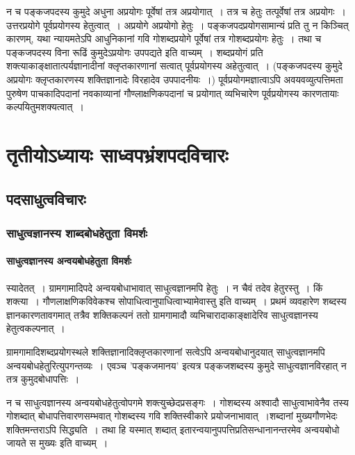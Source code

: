 				न च पङ्कजपदस्य कुमुदे अधुना अप्रयोगः पूर्वेषां तत्र अप्रयोगात्~। तत्र च हेतुः तत्पूर्वेषां तत्र अप्रयोगः~। उत्तरप्रयोगे  पूर्वप्रयोगस्य हेतुत्वात्~। अप्रयोगे अप्रयोगो हेतुः~। पङ्कजपदप्रयोगसामान्यं प्रति तु न किञ्चित् कारणम्, यथा न्यायमतेऽपि  आधुनिकानां गवि गोशब्दप्रयोगे पूर्वेषां तत्र गोशब्दप्रयोगः हेतुः~। तथा च पङ्कजपदस्य विना रूढिं  कुमुदेऽप्रयोगः उपपद्यते इति वाच्यम्~। शब्दप्रयोगं प्रति शक्त्याकाङ्क्षातात्पर्यज्ञानादीनां क्लृप्तकारणानां सत्वात् पूर्वप्रयोगस्य अहेतुत्वात्~। (पङ्कजपदस्य कुमुदे अप्रयोगः क्लृप्तकारणस्य शक्तिज्ञानादेः विरहादेव उपपादनीयः~।) पूर्वप्रयोगमज्ञात्वाऽपि अवयवव्युत्पत्तिमता पुरुषेण पाचकादिपदानां नवकाव्यानां गौण्लाक्षणिकपदानां च प्रयोगात् व्यभिचारेण पूर्वप्रयोगस्य कारणतायाः कल्पयितुमशक्यत्वात्~।
			
\chapter{तृतीयोऽध्यायः साध्वपभ्रंशपदविचारः}

	\section{पदसाधुत्वविचारः}
	
		\subsection{साधुत्वज्ञानस्य शाब्दबोधहेतुता विमर्शः}
	
			\subsubsection{साधुत्वज्ञानस्य अन्वयबोधहेतुता विमर्शः}
			
				\begin{small}
					
					स्यादेतत्~। ग्रामगामादिपदे अन्वयबोधाभावात् साधुत्वज्ञानमपि हेतुः~। न चैवं तदेव हेतुरस्तु~। किं शक्त्या~। गौणलाक्षणिकविवेकश्च सोपाधित्वानुपाधित्वाभ्यामेवास्तु इति वाच्यम्~। प्रथमं व्यवहारेण शब्दस्य ज्ञानकारणतावगमात् तत्रैव शक्तिकल्पनं ततो ग्रामगामादौ व्यभिचारादाकाङ्क्षादेरिव साधुत्वज्ञानस्य हेतुत्वकल्पनात्~। 
				\end{small}
			
				ग्रामगामादिशब्दप्रयोगस्थले शक्तिज्ञानादिक्लृप्तकारणानां सत्वेऽपि अन्वयबोधानुदयात् साधुत्वज्ञानमपि अन्वयबोधहेतुरित्युपगन्तव्यः~। एवञ्च ’पङ्कजमानय’ इत्यत्र पङ्कजशब्दस्य कुमुदे साधुत्वज्ञानविरहात् न तत्र कुमुदबोधापत्तिः~।
  
				न च साधुत्वज्ञानस्य अन्वयबोधहेतुत्वोपगमे शक्त्युच्छेदप्रसङ्गः~। गोशब्दस्य अश्वादौ साधुत्वाभावेनैव तस्य गोशब्दात् बोधापत्तिवारणसम्भवात् गोशब्दस्य गवि शक्तिस्वीकारे प्रयोजनाभावात्~।शब्दानां मुख्यगौणभेदः शक्तिमन्तराऽपि सिद्ध्यति~। तथा हि यस्मात् शब्दात् इतारन्वयानुपपत्तिप्रतिसन्धानानन्तरमेव अन्वयबोधो जायते स मुख्यः इति वाच्यम्~। 
	
